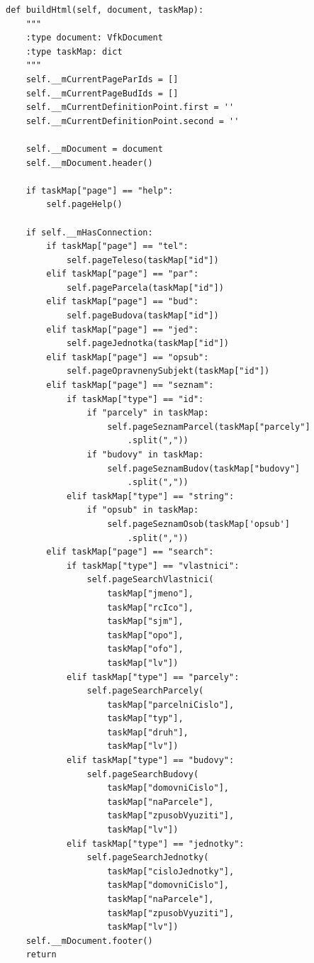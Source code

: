 \documentclass[a4paper,12pt,oneside]{book}
\begin{document}
\begin{lstlisting}[style=python, label=l_buildHtml]
def buildHtml(self, document, taskMap):
    """
    :type document: VfkDocument
    :type taskMap: dict
    """
    self.__mCurrentPageParIds = []
    self.__mCurrentPageBudIds = []
    self.__mCurrentDefinitionPoint.first = ''
    self.__mCurrentDefinitionPoint.second = ''

    self.__mDocument = document
    self.__mDocument.header()

    if taskMap["page"] == "help":
        self.pageHelp()

    if self.__mHasConnection:
        if taskMap["page"] == "tel":
            self.pageTeleso(taskMap["id"])
        elif taskMap["page"] == "par":
            self.pageParcela(taskMap["id"])
        elif taskMap["page"] == "bud":
            self.pageBudova(taskMap["id"])
        elif taskMap["page"] == "jed":
            self.pageJednotka(taskMap["id"])
        elif taskMap["page"] == "opsub":
            self.pageOpravnenySubjekt(taskMap["id"])
        elif taskMap["page"] == "seznam":
            if taskMap["type"] == "id":
                if "parcely" in taskMap:
                    self.pageSeznamParcel(taskMap["parcely"]
                    	.split(","))
                if "budovy" in taskMap:
                    self.pageSeznamBudov(taskMap["budovy"]
                    	.split(","))
            elif taskMap["type"] == "string":
                if "opsub" in taskMap:
                    self.pageSeznamOsob(taskMap['opsub']
                    	.split(","))
        elif taskMap["page"] == "search":
            if taskMap["type"] == "vlastnici":
                self.pageSearchVlastnici(
                    taskMap["jmeno"], 
                    taskMap["rcIco"],
                    taskMap["sjm"], 
                    taskMap["opo"],
                    taskMap["ofo"], 
                    taskMap["lv"])
            elif taskMap["type"] == "parcely":
                self.pageSearchParcely(
                    taskMap["parcelniCislo"], 
                    taskMap["typ"], 
                    taskMap["druh"], 
                    taskMap["lv"])
            elif taskMap["type"] == "budovy":
                self.pageSearchBudovy(
                    taskMap["domovniCislo"], 
                    taskMap["naParcele"], 
                    taskMap["zpusobVyuziti"],
                    taskMap["lv"])
            elif taskMap["type"] == "jednotky":
                self.pageSearchJednotky(
                    taskMap["cisloJednotky"], 
                    taskMap["domovniCislo"], 
                    taskMap["naParcele"],
                    taskMap["zpusobVyuziti"], 
                    taskMap["lv"])
    self.__mDocument.footer()
    return
\end{lstlisting}
\end{document}

